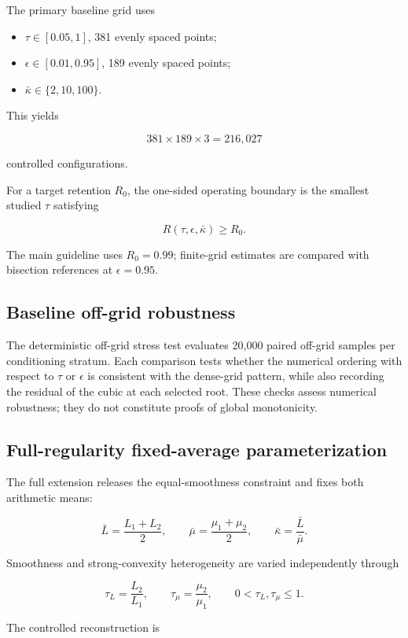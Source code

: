 The primary baseline grid uses

\begin{itemize}
\item $\tau\in [0.05,1]$, 381 evenly spaced points;
\item $\epsilon\in [0.01,0.95]$, 189 evenly spaced points;
\item $\bar{\kappa}\in \{2,10,100\}$.
\end{itemize}

This yields

\[
381\times 189\times 3=216{,}027
\]

controlled configurations.

For a target retention $R_0$, the one-sided operating boundary is the smallest studied $\tau$ satisfying

\[
R(\tau,\epsilon,\bar\kappa)\ge R_0.
\]

The main guideline uses $R_0=0.99$; finite-grid estimates are compared with bisection references at $\epsilon=0.95$.

\subsection{Baseline off-grid robustness}

The deterministic off-grid stress test evaluates 20,000 paired off-grid samples per conditioning stratum. Each comparison tests whether the numerical ordering with respect to $\tau$ or $\epsilon$ is consistent with the dense-grid pattern, while also recording the residual of the cubic at each selected root. These checks assess numerical robustness; they do not constitute proofs of global monotonicity.

\subsection{Full-regularity fixed-average parameterization}

The full extension releases the equal-smoothness constraint and fixes both arithmetic means:

\[
\bar L=\frac{L_1+L_2}{2},
\qquad
\bar\mu=\frac{\mu_1+\mu_2}{2},
\qquad
\bar\kappa=\frac{\bar L}{\bar\mu}.
\]

Smoothness and strong-convexity heterogeneity are varied independently through

\[
\tau_L=\frac{L_2}{L_1},
\qquad
\tau_\mu=\frac{\mu_2}{\mu_1},
\qquad
0<\tau_L,\tau_\mu\le 1.
\]

The controlled reconstruction is

